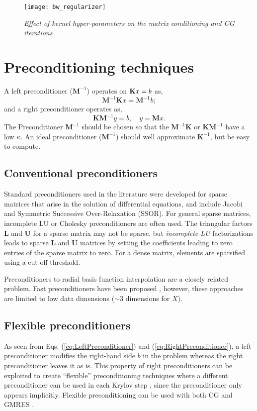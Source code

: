 \documentclass[10pt,journal,letterpaper,compsoc]{IEEEtran}
\begin{document}
\begin{figure}[bth]
\centering
\texttt{[image: bw\_regularizer]}
\caption{\emph{Effect of kernel hyper-parameters on the matrix conditioning and CG iterations}\label{fig:GaussianHyperparameters}}
\end{figure}

\section{Preconditioning techniques\label{sec:precond}}
A left preconditioner ($\mathbf{M}^{-1}$) operates on ${\bf K}x=b$ as,
\begin{equation}\mathbf{M}^{-1}\mathbf{K}x=\mathbf{M^{-1}}b; \label{eq:LeftPreconditioner}\end{equation}
and a right preconditioner operates as,
\begin{equation} \mathbf{KM}^{-1}y=b, \quad y=\mathbf{M}x.\label{eq:RightPreconditioner}\end{equation}
The Preconditioner $\mathbf{M}^{-1}$ should be chosen so that the $\mathbf{M}^{-1}\mathbf{K}$ or $\mathbf{K}\mathbf{M}^{-1}$ have a low $\kappa$. An ideal preconditioner ($\mathbf{M}^{-1}$) should well approximate $\mathbf{K}^{-1}$, but be easy to compute.

\subsection{Conventional preconditioners}
Standard preconditioners used in the literature were developed for sparse matrices that arise in the solution of differential equations, and include Jacobi and Symmetric Successive Over-Relaxation (SSOR). For general sparse matrices, incomplete LU or Cholesky preconditioners are often used. The triangular factors $\mathbf{L}$ and $\mathbf{U}$  for a sparse matrix may not be sparse, but {\em incomplete LU} factorizations leads to sparse $\mathbf{L}$ and $\mathbf{U}$ matrices by setting the coefficients leading to zero entries of the sparse matrix to zero. For a dense matrix, elements are sparsified using a cut-off threshold.

Preconditioners to radial basis function interpolation are a closely related problem. Fast preconditioners have been proposed \cite{RBF_Beatson, RBF_Faul, RBF_Gumerov}, however, these approaches are limited to low data dimensions ($\sim3$ dimensions for $X$).

\subsection{Flexible preconditioners}
As seen from Eqs. (\ref{eq:LeftPreconditioner}) and (\ref{eq:RightPreconditioner}), a left preconditioner modifies the right-hand side $b$ in the problem whereas the right preconditioner leaves it as is. This property of right preconditioners can be exploited to create ``flexible'' preconditioning techniques where a different preconditioner can be used in each Krylov step \cite{FGMRES,FlexibleKrylov,FlexibleCG}, since the preconditioner only appears implicitly. Flexible preconditioning can be used with both CG \cite{FlexibleCG} and GMRES \cite{FGMRES}.
\end{document}
